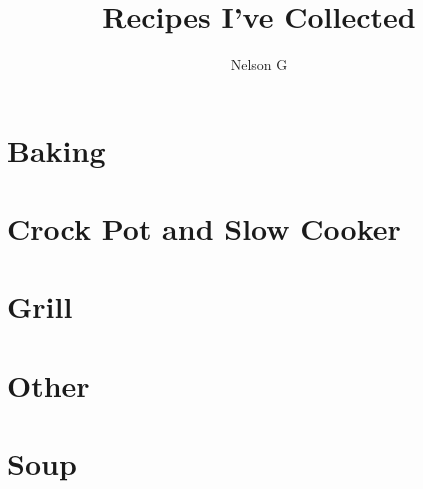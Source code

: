 \documentclass{book}
\title{Recipes I've Collected}
\author{Nelson G}
\begin{document}
\pagestyle{empty}
\maketitle
\tableofcontents

\pagestyle{main}



\chapter{Baking}







\chapter{Crock Pot and Slow Cooker}
















\chapter{Grill}


\chapter{Other}



\chapter{Soup}

\end{document}
